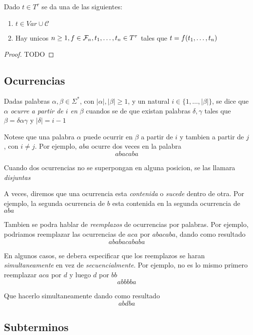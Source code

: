 \begin{theorem}
  Dado $t \in T^\tau$ se da una de las siguientes:
  \begin{enumerate}
    \item $t \in Var \cup \mathcal{C}$
    \item Hay unicos $n \geq 1, f \in \mathcal{F}_n, t_{1}, \dots, t_{n} \in T^\tau$ tales que $t = f(t_{1}, \dots, t_{n})$
  \end{enumerate}
\end{theorem}
\begin{proof}
  TODO
\end{proof}

\subsection{Ocurrencias}

\begin{definition}
  Dadas palabras $\alpha, \beta \in \Sigma^*$, con $|\alpha|, |\beta| \geq 1$, y un natural $i \in \{1, \dots, |\beta|\}$,
  se dice que $\alpha$ \emph{ocurre a partir de $i$ en} $\beta$ cuandos se de que existan palabras $\delta, \gamma$ tales que
  $\beta = \delta\alpha\gamma$ y $|\delta| = i - 1$

  Notese que una palabra $\alpha$ puede ocurrir en $\beta$ a partir de $i$ y tambien a partir de $j$, con $i \neq j$. Por ejemplo, $aba$ ocurre dos veces en la palabra
  $$abacaba$$

  Cuando dos ocurrencias no se superpongan en alguna posicion, se las llamara \emph{disjuntas}

  A veces, diremos que una ocurrencia esta \emph{contenida} o \emph{sucede} dentro de otra. Por ejemplo,
  la segunda ocurrencia de $b$ esta contenida en la segunda ocurrencia de $aba$ 

  Tambien se podra hablar de \emph{reemplazos} de ocurrencias por palabras. Por ejemplo, podriamos reemplazar las ocurrencias de $aca$ por $abacaba$, dando como resultado
  $$ ababacababa$$
  
  En algunos casos, se debera especificar
  que los reemplazos se haran \emph{simultaneamente} en vez de \emph{secuencialmente}. Por ejemplo, no es lo mismo primero reemplazar $aca$ por $d$ y luego $d$ por $bb$
  $$abbbba$$

  Que hacerlo simultaneamente dando como resultado
  $$abdba$$
\end{definition}

\subsection{Subterminos}

